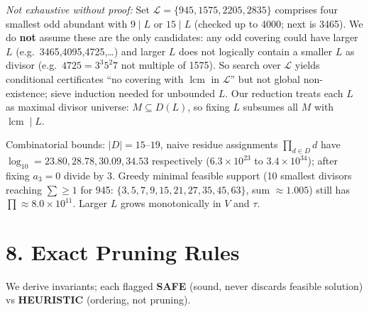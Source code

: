 \documentclass[11pt,a4paper]{article}
\theoremstyle{plain}
\theoremstyle{definition}
\theoremstyle{remark}
\begin{document}
\textit{Not exhaustive without proof:} Set $\mathcal L=\{945,1575,2205,2835\}$ comprises four smallest odd abundant with $9\mid L$ or $15\mid L$ (checked up to 4000; next is 3465). We do \textbf{not} assume these are the only candidates: any odd covering could have larger $L$ (e.g.\ 3465,4095,4725,\dots) and larger $L$ does not logically contain a smaller $L$ as divisor (e.g.\ $4725=3^{3}5^{2}7$ not multiple of 1575). So search over $\mathcal L$ yields conditional certificates ``no covering with $\operatorname{lcm}$ in $\mathcal L$'' but not global non-existence; sieve induction needed for unbounded $L$. Our reduction treats each $L$ as maximal divisor universe: $M\subseteq D(L)$, so fixing $L$ subsumes all $M$ with $\operatorname{lcm}\mid L$.

Combinatorial bounds: $|D|=15$--$19$, naive residue assignments $\prod_{d\in D}d$ have $\log_{10}=23.80,28.78,30.09,34.53$ respectively ($6.3\times10^{23}$ to $3.4\times10^{34}$); after fixing $a_{3}=0$ divide by 3. Greedy minimal feasible support (10 smallest divisors reaching $\sum\ge1$ for 945: $\{3,5,7,9,15,21,27,35,45,63\}$, sum $\approx1.005$) still has $\prod\approx8.0\times10^{11}$. Larger $L$ grows monotonically in $V$ and $\tau$.

\section{8. Exact Pruning Rules}

We derive invariants; each flagged \textbf{SAFE} (sound, never discards feasible solution) vs \textbf{HEURISTIC} (ordering, not pruning).
\end{document}
